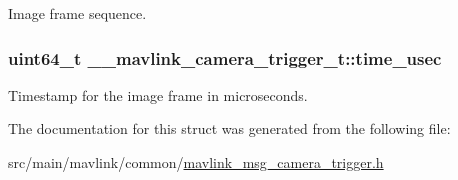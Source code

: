 Image frame sequence. 

\hypertarget{struct____mavlink__camera__trigger__t_aaf4f6693470c617e50f516d2f2233c87}{
\subsubsection[{time\+\_\+usec}]{\setlength{\rightskip}{0pt plus 5cm}uint64\+\_\+t \+\_\+\+\_\+mavlink\+\_\+camera\+\_\+trigger\+\_\+t\+::time\+\_\+usec}}\label{struct____mavlink__camera__trigger__t_aaf4f6693470c617e50f516d2f2233c87}


Timestamp for the image frame in microseconds. 



The documentation for this struct was generated from the following file\+:\begin{DoxyCompactItemize}
\item 
src/main/mavlink/common/\hyperlink{mavlink__msg__camera__trigger_8h}{mavlink\+\_\+msg\+\_\+camera\+\_\+trigger.\+h}\end{DoxyCompactItemize}
